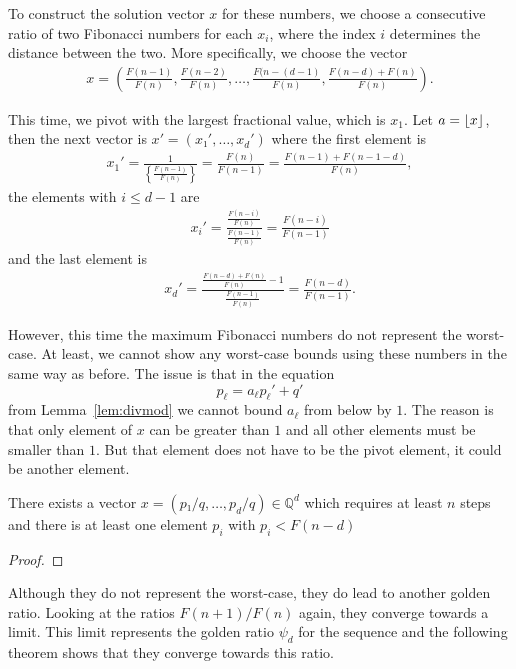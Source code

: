 To construct the solution vector $x$ for these numbers, we choose a consecutive
ratio of two Fibonacci numbers for each $x_i$, where the index $i$ determines
the distance between the two.
More specifically, we choose the vector
\begin{align*}
  x = \left(
    \frac{F(n-1)}{F(n)},
    \frac{F(n-2)}{F(n)},
    …,
    \frac{F(n-(d-1)}{F(n)},
    \frac{F(n-d) + F(n)}{F(n)} \right).
\end{align*}

This time, we pivot with the largest fractional value, which is $x_1$.
Let $a = \left\lfloor x\right\rfloor$, then the next vector is $x' = (x₁', …, x_d')$ where
the first element is
\begin{align*}
  x_1'
  = \frac{1}{\left\{\frac{F(n-1)}{F(n)}\right\}}
  = \frac{F(n)}{F(n-1)}
  = \frac{F(n-1) + F(n-1-d)}{F(n)},
\end{align*}
the elements with $i ≤ d - 1$ are
\begin{align*}
  x_i'
  = \frac{\frac{F(n-i)}{F(n)}}{\frac{F(n-1)}{F(n)}}
  = \frac{F(n-i)}{F(n-1)}
\end{align*}
and the last element is
\begin{align*}
  x_d'
  = \frac{\frac{F(n-d) + F(n)}{F(n)} - 1}{\frac{F(n-1)}{F(n)}}
  = \frac{F(n-d)}{F(n-1)}.
\end{align*}

However, this time the maximum Fibonacci numbers do not represent the worst-case.
At least, we cannot show any worst-case bounds using these numbers in the same way as before.
The issue is that in the equation
\[
  p_ℓ = a_ℓ p_ℓ' + q'
\]
from Lemma~\ref{lem:divmod} we cannot bound $a_ℓ$ from below by $1$.
The reason is that only element of $x$ can be greater than $1$
and all other elements must be smaller than $1$.
But that element does not have to be the pivot element,
it could be another element.

\begin{theorem}
  There exists a vector $x = (p₁/q, …, p_d/q) ∈ ℚ^d$ which requires at least $n$ steps
  and there is at least one element $p_i$ with $p_i < F(n-d)$
\end{theorem}

\begin{proof}
\end{proof}

Although they do not represent the worst-case,
they do lead to another golden ratio.
Looking at the ratios $F(n+1)/F(n)$ again,
they converge towards a limit.
This limit represents the golden ratio $ψ_d$ for the sequence and
the following theorem shows that they converge towards this ratio.

